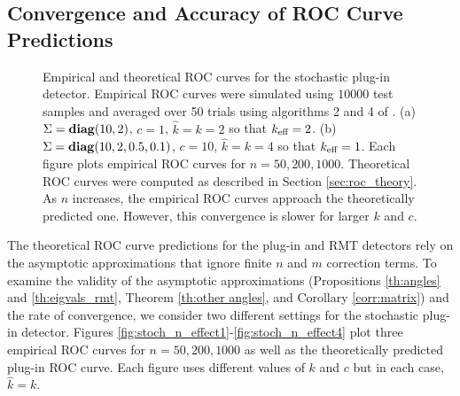 \subsection{Convergence and Accuracy of ROC Curve Predictions}
\begin{figure}[t]
\centering
{}
\vspace{-0.1in}
\caption{Empirical and theoretical ROC curves for the stochastic plug-in detector. Empirical ROC curves were simulated using $10000$ test samples and averaged over 50 trials using algorithms 2 and 4 of \cite{fawcett2006introduction}. (a) $\Sigma=\mathop{\bf diag}(10,2)$, $c=1$, $\widehat{k}=k=2$ so that $k_\text{eff}=2$. (b) $\Sigma=\mathop{\bf diag}(10,2,0.5,0.1)$, $c=10$, $\widehat{k}=k=4$ so that $k_\text{eff}=1$. Each figure plots empirical ROC curves for $n=50,200,1000$. Theoretical ROC curves were computed as described in Section \ref{sec:roc_theory}. As $n$ increases, the empirical ROC curves approach the theoretically predicted one. However, this convergence is slower for larger $k$ and $c$.}
\vspace{-0.3in}
\end{figure}

The theoretical ROC curve predictions for the plug-in and RMT detectors rely on the asymptotic approximations that ignore finite $n$ and $m$ correction terms. To examine the validity of the asymptotic approximations (Propositions \ref{th:angles} and \ref{th:eigvals_rmt}, Theorem \ref{th:other angles}, and Corollary \ref{corr:matrix}) and the rate of convergence, we consider two different settings for the stochastic plug-in detector. Figures \ref{fig:stoch_n_effect1}-\ref{fig:stoch_n_effect4} plot three empirical ROC curves for $n=50,200,1000$ as well as the theoretically predicted plug-in ROC curve. Each figure uses different values of $k$ and $c$ but in each case, $\widehat{k}=k$.

